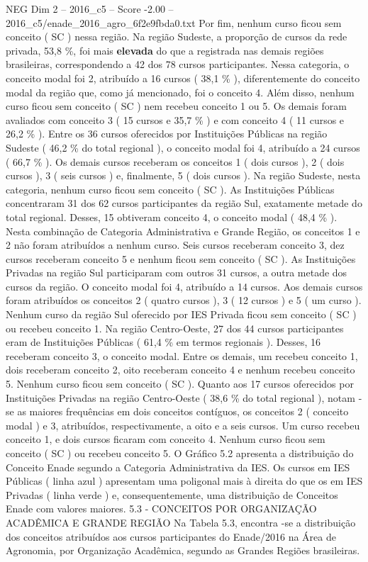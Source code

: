 \begin{textsample}{NEG Dim 2 – 2016\_c5 – Score -2.00 – 2016\_c5/enade\_2016\_agro\_6f2e9fbda0.txt}
Por fim, nenhum curso ficou sem conceito ( SC ) nessa região.
Na região Sudeste, a proporção de cursos da rede privada, 53,8 \%, foi mais \textbf{elevada} do que a registrada nas demais regiões brasileiras, correspondendo a 42 dos 78 cursos participantes.
Nessa categoria, o conceito modal foi 2, atribuído a 16 cursos ( 38,1 \% ), diferentemente do conceito modal da região que, como já mencionado, foi o conceito 4.
Além disso, nenhum curso ficou sem conceito ( SC ) nem recebeu conceito 1 ou 5.
Os demais foram avaliados com conceito 3 ( 15 cursos e 35,7 \% ) e com conceito 4 ( 11 cursos e 26,2 \% ).
Entre os 36 cursos oferecidos por Instituições Públicas na região Sudeste ( 46,2 \% do total regional ), o conceito modal foi 4, atribuído a 24 cursos ( 66,7 \% ).
Os demais cursos receberam os conceitos 1 ( dois cursos ), 2 ( dois cursos ), 3 ( seis cursos ) e, finalmente, 5 ( dois cursos ).
Na região Sudeste, nesta categoria, nenhum curso ficou sem conceito ( SC ).
As Instituições Públicas concentraram 31 dos 62 cursos participantes da região Sul, exatamente metade do total regional.
Desses, 15 obtiveram conceito 4, o conceito modal ( 48,4 \% ).
Nesta combinação de Categoria Administrativa e Grande Região, os conceitos 1 e 2 não foram atribuídos a nenhum curso.
Seis cursos receberam conceito 3, dez cursos receberam conceito 5 e nenhum ficou sem conceito ( SC ).
As Instituições Privadas na região Sul participaram com outros 31 cursos, a outra metade dos cursos da região.
O conceito modal foi 4, atribuído a 14 cursos.
Aos demais cursos foram atribuídos os conceitos 2 ( quatro cursos ), 3 ( 12 cursos ) e 5 ( um curso ).
Nenhum curso da região Sul oferecido por IES Privada ficou sem conceito ( SC ) ou recebeu conceito 1.
Na região Centro-Oeste, 27 dos 44 cursos participantes eram de Instituições Públicas ( 61,4 \% em termos regionais ).
Desses, 16 receberam conceito 3, o conceito modal.
Entre os demais, um recebeu conceito 1, dois receberam conceito 2, oito receberam conceito 4 e nenhum recebeu conceito 5.
Nenhum curso ficou sem conceito ( SC ).
Quanto aos 17 cursos oferecidos por Instituições Privadas na região Centro-Oeste ( 38,6 \% do total regional ), notam -se as maiores frequências em dois conceitos contíguos, os conceitos 2 ( conceito modal ) e 3, atribuídos, respectivamente, a oito e a seis cursos.
Um curso recebeu conceito 1, e dois cursos ficaram com conceito 4.
Nenhum curso ficou sem conceito ( SC ) ou recebeu conceito 5.
O Gráfico 5.2 apresenta a distribuição do Conceito Enade segundo a Categoria Administrativa da IES.
Os cursos em IES Públicas ( linha azul ) apresentam uma poligonal mais à direita do que os em IES Privadas ( linha verde ) e, consequentemente, uma distribuição de Conceitos Enade com valores maiores. 5.3 - CONCEITOS POR ORGANIZAÇÃO ACADÊMICA E GRANDE REGIÃO Na Tabela 5.3, encontra -se a distribuição dos conceitos atribuídos aos cursos participantes do Enade/2016 na Área de Agronomia, por Organização Acadêmica, segundo as Grandes Regiões brasileiras.

\end{textsample}
